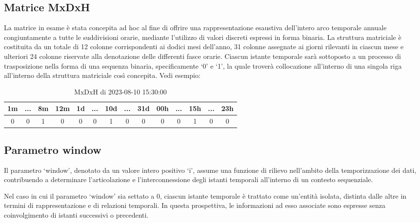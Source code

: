 \documentclass[a4paper,10pt]{article}
\begin{document}
\subsection{Matrice MxDxH}

La matrice in esame è stata concepita ad hoc al fine di offrire una rappresentazione esaustiva dell'intero arco 
temporale annuale congiuntamente a tutte le suddivisioni orarie, mediante l'utilizzo di valori discreti espressi in forma binaria. 
La struttura matriciale è costituita da un totale di 12 colonne corrispondenti ai dodici mesi dell'anno, 31 colonne assegnate 
ai giorni rilevanti in ciascun mese e ulteriori 24 colonne riservate alla denotazione delle differenti fasce orarie. 
Ciascun istante temporale sarà sottoposto a un processo di trasposizione nella forma di una sequenza binaria, specificamente `0' e `1', 
la quale troverà collocazione all'interno di una singola riga all'interno della struttura matriciale così concepita. Vedi esempio:
 
\begin{table}[h]\centering
  \begin{tabular}{|*{14}{c|}}
  
  \hline
  1m & ... & 8m & 12m & 1d & ... & 10d & ... & 31d & 00h & ... & 15h & ... & 23h\\
  \hline
  0 & 0 & 1 & 0 & 0 & 0 & 1 & 0 & 0 & 0 & 0 & 1 & 0 & 0\\
  \hline
  
  \end{tabular}
  
  \caption{MxDxH di 2023-08-10 15:30:00}
\end{table}

\subsection{Parametro window}

Il parametro `window', denotato da un valore intero positivo `i', assume una funzione di rilievo nell'ambito della temporizzazione dei dati, 
contribuendo a determinare l'articolazione e l'interconnessione degli istanti temporali all'interno di un contesto sequenziale.

Nel caso in cui il parametro `window' sia settato a 0, ciascun istante temporale è trattato come un'entità isolata, distinta dalle altre in termini 
di rappresentazione e di relazioni temporali. In questa prospettiva, le informazioni ad esso associate sono espresse senza coinvolgimento di 
istanti successivi o precedenti.
\end{document}

